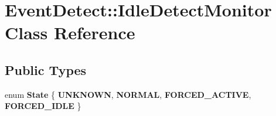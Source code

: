 \hypertarget{classEventDetect_1_1IdleDetectMonitor}{}\section{Event\+Detect\+:\+:Idle\+Detect\+Monitor Class Reference}
\label{classEventDetect_1_1IdleDetectMonitor}
\subsection*{Public Types}
\begin{DoxyCompactItemize}
\item 
\mbox{\label{classEventDetect_1_1IdleDetectMonitor_a2fc7d8ccc92a76fdd7584318169cbc5f}} 
enum {\bfseries State} \{ {\bfseries U\+N\+K\+N\+O\+WN}, 
{\bfseries N\+O\+R\+M\+AL}, 
{\bfseries F\+O\+R\+C\+E\+D\+\_\+\+A\+C\+T\+I\+VE}, 
{\bfseries F\+O\+R\+C\+E\+D\+\_\+\+I\+D\+LE}
 \}
\end{DoxyCompactItemize}
